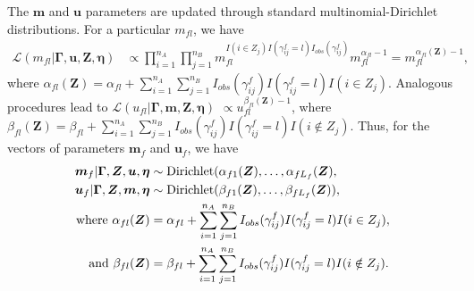 \documentclass[12pt,letterpaper]{article}
\newcommand{\1}[1]{\mathbb{I}\!\left[#1\right]} %
\begin{document}
The $\bm{m}$ and $\bm{u}$ parameters are updated through standard multinomial-Dirichlet distributions. For a particular $m_{fl}$, we have
\begin{align*}
	\mathcal{L}(m_{fl}|\bm{\Gamma}, \bm{u}, \bm{Z}, \bm{\eta}) &\propto \prod_{i=1}^{n_A} \prod_{j=1}^{n_B} m_{fl}^{I(i \in Z_j) I(\gamma_{ij}^f = l) I_{obs}(\gamma_{ij}^f)}  m_{fl}^{\alpha_{fl} - 1} = m_{fl}^{\alpha_{fl}(\bm{Z}) - 1},
\end{align*}
where $\alpha_{fl}(\bm{Z})= \alpha_{fl} + \sum_{i=1}^{n_A}  \sum_{j=1}^{n_B} I_{obs}(\gamma_{ij}^f)I(\gamma_{ij}^f = l) I(i \in Z_j)$. Analogous procedures lead to $\mathcal{L}(u_{fl}| \bm{\Gamma}, \bm{m}, \bm{Z}, \bm{\eta})$  $\propto u_{fl}^{\beta_{fl}(\bm{Z}) - 1}$, where $\beta_{fl}(\bm{Z})= \beta_{fl} + \sum_{i=1}^{n_A}  \sum_{j=1}^{n_B} I_{obs}(\gamma_{ij}^f)I(\gamma_{ij}^f = l) I(i \notin Z_j)$. Thus, for the vectors of parameters $\bm{m}_f$ and $\bm{u}_f$, we have
	\begin{align}
		\bm{m}_f|\bm{\Gamma}, \bm{Z}, \bm{u}, \bm{\eta} &\sim \text{Dirichlet}(\alpha_{f1}(\bm{Z}), \ldots, \alpha_{fL_f}(\bm{Z}), \notag \\
		\bm{u}_f|\bm{\Gamma}, \bm{Z}, \bm{m}, \bm{\eta} &\sim \text{Dirichlet}(\beta_{f1}(\bm{Z}), \ldots, \beta_{fL_f}(\bm{Z})), \notag \\
		\text{where }\alpha_{fl}(\bm{Z})&= \alpha_{fl} + \sum_{i=1}^{n_A}\sum_{j=1}^{n_B} I_{obs}(\gamma_{ij}^f) I(\gamma_{ij}^f = l) I(i \in Z_j), \label{eqn:alpha_update} \\
		\text{and } \beta_{fl}(\bm{Z})&=  \beta_{fl} + \sum_{i=1}^{n_A}\sum_{j=1}^{n_B}  I_{obs}(\gamma_{ij}^f) I(\gamma_{ij}^f = l) I(i \notin Z_j) \label{eqn:beta_update}.
	\end{align}
\end{document}

